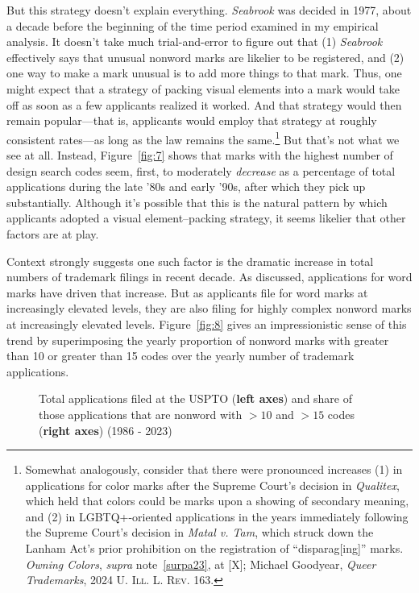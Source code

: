 \documentclass[letterpaper, 11pt, oneside]{article}
\begin{document}
But this strategy doesn't explain everything. \textit{Seabrook} was decided in 1977, about a decade before the beginning of the time period examined in my empirical analysis. It doesn't take much trial-and-error to figure out that (1) \textit{Seabrook} effectively says that unusual nonword marks are likelier to be registered, and (2) one way to make a mark unusual is to add more things to that mark. Thus, one might expect that a strategy of packing visual elements into a mark would take off as soon as a few applicants realized it worked. And that strategy would then remain popular—that is, applicants would employ that strategy at roughly consistent rates—as long as the law remains the same.\footnote{Somewhat analogously, consider that there were pronounced increases (1) in applications for color marks after the Supreme Court's decision in \textit{Qualitex}, which held that colors could be marks upon a showing of secondary meaning, and (2) in LGBTQ+-oriented applications in the years immediately following the Supreme Court's decision in \textit{Matal v. Tam}, which struck down the Lanham Act's prior prohibition on the registration of ``disparag[ing]'' marks. \textit{Owning Colors}, \textit{supra} note~\ref{surpa23}, at [X]; Michael Goodyear, \textit{Queer Trademarks}, 2024 \textsc{U. Ill. L. Rev.} 163.} But that's not what we see at all. Instead, Figure~\ref{fig:7} shows that marks with the highest number of design search codes seem, first, to moderately \textit{decrease} as a percentage of total applications during the late '80s and early '90s, after which they pick up substantially. Although it's possible that this is the natural pattern by which applicants adopted a visual element–packing strategy, it seems likelier that other factors are at play.

Context strongly suggests one such factor is the dramatic increase in total numbers of trademark filings in recent decade. As discussed, applications for word marks have driven that increase. But as applicants file for word marks at increasingly elevated levels, they are also filing for highly complex nonword marks at increasingly elevated levels. Figure~\ref{fig:8} gives an impressionistic sense of this trend by superimposing the yearly proportion of nonword marks with greater than 10 or greater than 15 codes over the yearly number of trademark applications.

\addtocounter{figure}{-3}

\begin{figure}[H]
\centering

\caption{\label{fig:12} Total applications filed at the USPTO (\textbf{\color{oxfordblue}left axes}) and share of those applications that are nonword with $>10$ and $>15$ codes (\textbf{\color{seafoam}right axes}) (1986 - 2023)}
\end{figure}
\end{document}
